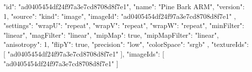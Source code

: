 {
  "id": "ad0405454df24f97a3e7cd8708d8f7e1",
  "name": "Pine Bark ARM",
  "version": 1,
  "source": {
    "kind": "image",
    "imageId": "ad0405454df24f97a3e7cd8708d8f7e1"
  },
  "settings": {
    "wrapU": "repeat",
    "wrapV": "repeat",
    "wrapW": "repeat",
    "minFilter": "linear",
    "magFilter": "linear",
    "mipMap": true,
    "mipMapFilter": "linear",
    "anisotropy": 1,
    "flipY": true,
    "precision": "low",
    "colorSpace": "srgb"
  },
  "textureIds": [
    "ad0405454df24f97a3e7cd8708d8f7e1"
  ],
  "imageIds": [
    "ad0405454df24f97a3e7cd8708d8f7e1"
  ]
}
